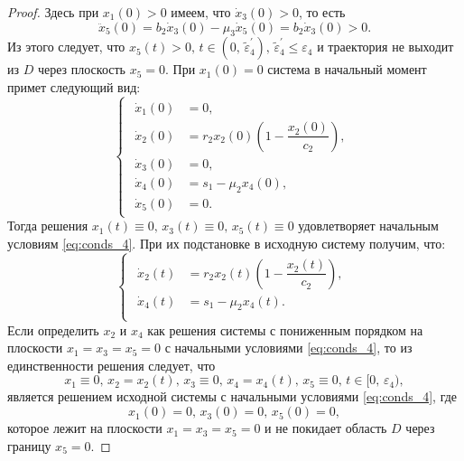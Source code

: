 \documentclass[14pt,a4paper]{extarticle}
\begin{document}
\begin{proof}
		Здесь при $x_1(0)>0$ имеем, что $\dot{x}_3(0)>0$, то есть
		\[\ddot{x}_5(0)=b_2\dot{x}_3(0)-\mu_3\dot{x}_5(0)=b_2\dot{x}_3(0)>0.\] 
		Из этого следует, что $x_5(t)>0,\, t\in(0,\, \tilde{\varepsilon}^\prime_4),\,\tilde{\varepsilon}^\prime_4\le\varepsilon_4$ и траектория не выходит из $D$ через плоскость $x_5=0$. При $x_1(0)=0$ система в начальный момент примет следующий вид:
		\begin{equation*}
			\begin{cases}
				\begin{aligned}
					\dot{x}_1(0) &= 0,\\
					\dot{x}_2(0) &= r_2x_2(0)\left(1-\dfrac{x_2(0)}{c_2}\right),\\
					\dot{x}_3(0) &= 0,\\ 
					\dot{x}_4(0) &= s_1-\mu_2x_4(0),\\
					\dot{x}_5(0) &= 0.
				\end{aligned}
			\end{cases}
		\end{equation*}
		Тогда решения $x_1(t)\equiv0,\, x_3(t)\equiv0,\, x_5(t)\equiv0$ удовлетворяет начальным условиям \ref{eq:conds_4}. При их подстановке в исходную систему получим, что:
		\begin{equation*}
			\begin{cases}
				\begin{aligned}
					\dot{x}_2(t) &= r_2x_2(t)\left(1-\dfrac{x_2(t)}{c_2}\right),\\
					\dot{x}_4(t) &= s_1-\mu_2x_4(t).\\
				\end{aligned}
			\end{cases}
		\end{equation*}
		Если определить $x_2$ и $x_4$ как решения системы с пониженным порядком на плоскости $x_1=x_3=x_5=0$ с начальными условиями \ref{eq:conds_4}, то из единственности решения следует, что
		\[x_1\equiv0,\, x_2=x_2(t),\, x_3\equiv0,\, x_4=x_4(t),\, x_5\equiv0,\, t\in[0,\,\varepsilon_4),\]
		является решением исходной системы с начальными условиями \ref{eq:conds_4}, где
		\[x_1(0)=0,\, x_3(0)=0,\, x_5(0)=0,\]
		которое лежит на плоскости $x_1=x_3=x_5=0$ и не покидает область $D$ через границу $x_5=0$.
		

\end{proof}
\end{document}
